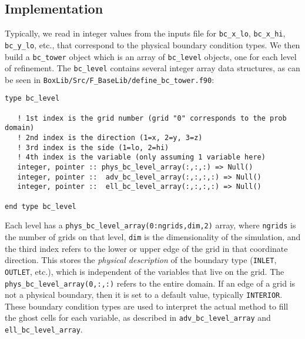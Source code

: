 \subsection{Implementation}
Typically, we read in integer values from the inputs file for {\tt bc\_x\_lo}, 
{\tt bc\_x\_hi}, {\tt bc\_y\_lo}, etc., that correspond to the physical boundary condition types.
We then build a {\tt bc\_tower} object which is an array of {\tt bc\_level} objects, one for
each level of refinement.  The {\tt bc\_level} contains several integer array data structures,
as can be seen in {\tt BoxLib/Src/F\_BaseLib/define\_bc\_tower.f90}:
\begin{lstlisting}[backgroundcolor=\color{light-green}]
type bc_level

   ! 1st index is the grid number (grid "0" corresponds to the prob domain)
   ! 2nd index is the direction (1=x, 2=y, 3=z)
   ! 3rd index is the side (1=lo, 2=hi)
   ! 4th index is the variable (only assuming 1 variable here)
   integer, pointer :: phys_bc_level_array(:,:,:) => Null()
   integer, pointer ::  adv_bc_level_array(:,:,:,:) => Null()
   integer, pointer ::  ell_bc_level_array(:,:,:,:) => Null()

end type bc_level
\end{lstlisting}
Each level has a {\tt phys\_bc\_level\_array(0:ngrids,dim,2)} array, where {\tt ngrids} is the number of
grids on that level, {\tt dim} is the dimensionality of the simulation, and the third index refers to
the lower or upper edge of the grid in that coordinate direction.  This stores the {\it physical description}
of the boundary type ({\tt INLET}, {\tt OUTLET}, etc.), which is independent of the variables that live on
the grid.  The {\tt phys\_bc\_level\_array(0,:,:)} refers to the entire domain.  If an edge of a grid is not
a physical boundary, then it is set to a default value, typically {\tt INTERIOR}.  These boundary condition
types are used to interpret the actual method to fill the ghost cells for each variable, as described
in {\tt adv\_bc\_level\_array} and {\tt ell\_bc\_level\_array}.

